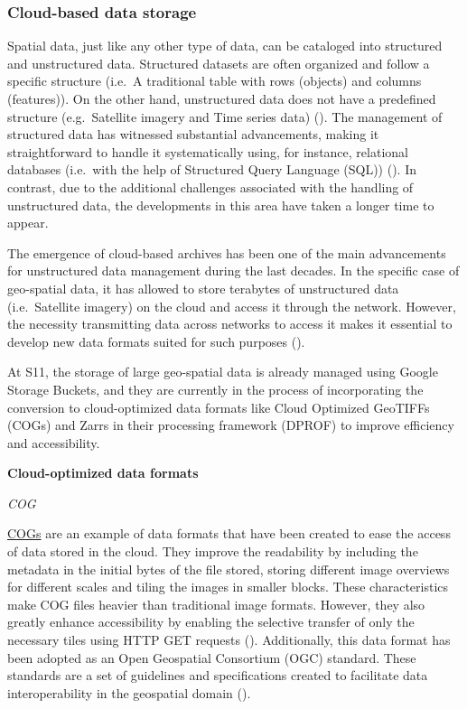 \documentclass[
  oneside,
  open=any]{scrbook}
\begin{document}
\subsubsection*{Cloud-based data
storage}\label{cloud-based-data-storage}

Spatial data, just like any other type of data, can be cataloged into
structured and unstructured data. Structured datasets are often
organized and follow a specific structure (i.e.~A traditional table with
rows (objects) and columns (features)). On the other hand, unstructured
data does not have a predefined structure (e.g.~Satellite imagery and
Time series data) (). The management of structured data has witnessed
substantial advancements, making it straightforward to handle it
systematically using, for instance, relational databases (i.e.~with the
help of Structured Query Language (SQL))
(). In
contrast, due to the additional challenges associated with the handling
of unstructured data, the developments in this area have taken a longer
time to appear.

The emergence of cloud-based archives has been one of the main
advancements for unstructured data management during the last decades.
In the specific case of geo-spatial data, it has allowed to store
terabytes of unstructured data (i.e.~Satellite imagery) on the cloud and
access it through the network. However, the necessity transmitting data
across networks to access it makes it essential to develop new data
formats suited for such purposes
().

At S11, the storage of large geo-spatial data is already managed using
Google Storage Buckets, and they are currently in the process of
incorporating the conversion to cloud-optimized data formats like Cloud
Optimized GeoTIFFs (COGs) and Zarrs in their processing framework
(DPROF) to improve efficiency and accessibility.

\newpage

\textbf{Cloud-optimized data formats}

\emph{COG}

\href{https://www.cogeo.org/}{COGs} are an example of data formats that
have been created to ease the access of data stored in the cloud. They
improve the readability by including the metadata in the initial bytes
of the file stored, storing different image overviews for different
scales and tiling the images in smaller blocks. These characteristics
make COG files heavier than traditional image formats. However, they
also greatly enhance accessibility by enabling the selective transfer of
only the necessary tiles using HTTP GET requests
().
Additionally, this data format has been adopted as an Open Geospatial
Consortium (OGC) standard. These standards are a set of guidelines and
specifications created to facilitate data interoperability in the
geospatial domain ().
\end{document}
